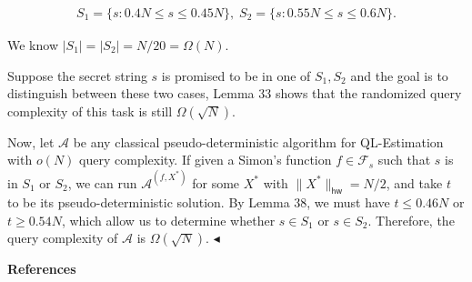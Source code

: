 \[\begin{gathered}
S_{1}=\{s:0.4N\leq s\leq 0.45N\},\;S_{2}=\{s:0.55N\leq s\leq 0.6N\}.
\end{gathered}\]


We know $|S_{1}|=|S_{2}|=N/20=\Omega(N)$.\par




Suppose the secret string $s$ is promised to be in one of $S_{1},S_{2}$ and the goal is to distinguish between these two cases, Lemma 33 shows that the randomized query complexity of this task is still $\Omega(\sqrt{N})$.\par




Now, let $\mathcal{A}$ be any classical pseudo-deterministic algorithm for QL-Estimation with $o(N)$ query complexity. If given a Simon’s function $f\in\mathcal{F}_{s}$ such that $s$ is in $S_{1}$ or $S_{2}$, we can run $\mathcal{A}^{(f,X^{*})}$ for some $X^{*}$ with $\|X^{*}\|_{\mathsf{hw}}=N/2$, and take $t$ to be its pseudo-deterministic solution. By Lemma 38, we must have $t\leq 0.46N$ or $t\geq 0.54N$, which allow us to determine whether $s\in S_{1}$ or $s\in S_{2}$. Therefore, the query complexity of $\mathcal{A}$ is $\Omega(\sqrt{N})$.
$\blacktriangleleft$\par








\par\medskip\noindent\textbf{References}\par



